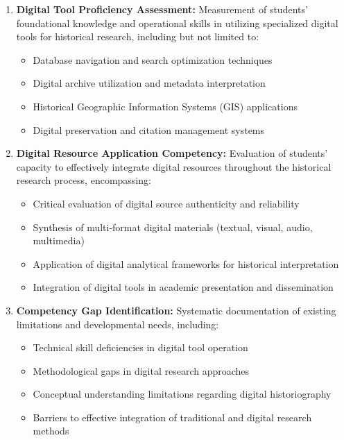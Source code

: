 \begin{enumerate}
    \item \textbf{Digital Tool Proficiency Assessment:} Measurement of students' foundational knowledge and operational skills in utilizing specialized digital tools for historical research, including but not limited to:
    \begin{itemize}
        \item Database navigation and search optimization techniques
        \item Digital archive utilization and metadata interpretation
        \item Historical Geographic Information Systems (GIS) applications
        \item Digital preservation and citation management systems
    \end{itemize}
    
    \item \textbf{Digital Resource Application Competency:} Evaluation of students' capacity to effectively integrate digital resources throughout the historical research process, encompassing:
    \begin{itemize}
        \item Critical evaluation of digital source authenticity and reliability
        \item Synthesis of multi-format digital materials (textual, visual, audio, multimedia)
        \item Application of digital analytical frameworks for historical interpretation
        \item Integration of digital tools in academic presentation and dissemination
    \end{itemize}
    
    \item \textbf{Competency Gap Identification:} Systematic documentation of existing limitations and developmental needs, including:
    \begin{itemize}
        \item Technical skill deficiencies in digital tool operation
        \item Methodological gaps in digital research approaches
        \item Conceptual understanding limitations regarding digital historiography
        \item Barriers to effective integration of traditional and digital research methods
    \end{itemize}
\end{enumerate}

